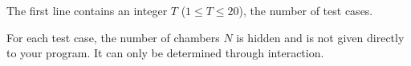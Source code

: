 The first line contains an integer $T$ ($1 \le T \le 20$), the number of test cases.

For each test case, the number of chambers $N$ is hidden and is not given directly to your program. It can only be determined through interaction.